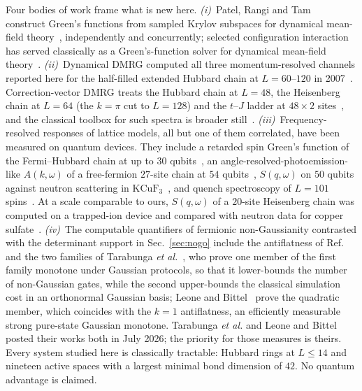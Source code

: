 Four bodies of work frame what is new here. \emph{(i)}~Patel, Rangi and Tam~\cite{patel2026}
construct Green's functions from sampled Krylov subspaces for dynamical mean-field
theory~\cite{dmft1996}, independently and concurrently; selected configuration interaction has
served classically as a Green's-function solver for dynamical mean-field theory~\cite{mejutozaera2019}. \emph{(ii)}~Dynamical DMRG computed all three momentum-resolved channels reported here
for the half-filled extended Hubbard chain at $L=60$--$120$ in 2007~\cite{benthien2007}.
Correction-vector DMRG treats the Hubbard chain at $L=48$, the Heisenberg chain at $L=64$ (the
$k=\pi$ cut to $L=128$) and the $t$--$J$ ladder at $48\times2$ sites~\cite{nocera2016}, and the
classical toolbox for such spectra is broader
still~\cite{kuehner1999,whitefeiguin2004,holzner2011,kpm2006,paeckel2019,tdasci2024}.
\emph{(iii)}~Frequency-resolved responses of lattice models, all but one of them correlated, have
been measured on quantum devices. They include a
retarded spin Green's function of the Fermi--Hubbard chain at up to $30$ qubits~\cite{vilchez2025},
an angle-resolved-photoemission-like $A(k,\omega)$ of a free-fermion $27$-site chain at $54$
qubits~\cite{granet2026akw}, $S(q,\omega)$ on $50$ qubits against neutron scattering in
$\mathrm{KCuF_3}$~\cite{lee2026sqw}, and quench spectroscopy of $L=101$ spins~\cite{millar2026}. At a
scale comparable to ours, $S(q,\omega)$ of a $20$-site Heisenberg chain was computed on a trapped-ion
device and compared with neutron data for copper sulfate~\cite{quantinuum_dsf2026}. \emph{(iv)}~The
computable quantifiers of fermionic non-Gaussianity contrasted with the determinant support in
Sec.~\ref{sec:nogo} include the antiflatness of Ref.~\cite{sierant2026} and the two families of
Tarabunga \emph{et al.}~\cite{tarabunga2026}, who prove one member of the first family monotone under
Gaussian protocols, so that it lower-bounds the number of non-Gaussian gates, while the second
upper-bounds the classical simulation cost in an orthonormal Gaussian basis; Leone and
Bittel~\cite{leonebittel2026} prove the quadratic member, which coincides with the $k=1$
antiflatness, an efficiently measurable strong pure-state Gaussian monotone. Tarabunga \emph{et al.} and Leone and
Bittel posted their works both in July 2026; the priority for those measures is theirs. Every system
studied here is classically tractable: Hubbard rings at $L\le14$ and nineteen
active spaces with a largest minimal bond dimension of $42$. No quantum advantage is claimed.

